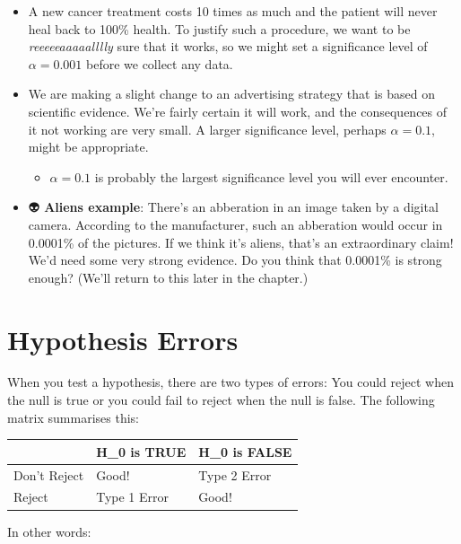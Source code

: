 \documentclass[
  letterpaper,
  DIV=11,
  numbers=noendperiod,
  oneside]{scrreprt}
\providecommand{\tightlist}{%
  \setlength{\itemsep}{0pt}\setlength{\parskip}{0pt}}\usepackage{longtable,booktabs,array}
\begin{document}
\begin{itemize}
\tightlist
\item
  A new cancer treatment costs 10 times as much and the patient will
  never heal back to 100\% health. To justify such a procedure, we want
  to be \emph{reeeeeaaaaalllly} sure that it works, so we might set a
  significance level of \(\alpha=0.001\) before we collect any data.
\item
  We are making a slight change to an advertising strategy that is based
  on scientific evidence. We're fairly certain it will work, and the
  consequences of it not working are very small. A larger significance
  level, perhaps \(\alpha = 0.1\), might be appropriate.

  \begin{itemize}
  \tightlist
  \item
    \(\alpha = 0.1\) is probably the largest significance level you will
    ever encounter.
  \end{itemize}
\item
  👽 \textbf{Aliens example}: There's an abberation in an image taken by
  a digital camera. According to the manufacturer, such an abberation
  would occur in 0.0001\% of the pictures. If we think it's aliens,
  that's an extraordinary claim! We'd need some very strong evidence. Do
  you think that 0.0001\% is strong enough? (We'll return to this later
  in the chapter.)
\end{itemize}

\hypertarget{hypothesis-errors}{%
\section{Hypothesis Errors}\label{hypothesis-errors}}

When you test a hypothesis, there are two types of errors: You could
reject when the null is true or you could fail to reject when the null
is false. The following matrix summarises this:

\begin{longtable}[]{@{}lll@{}}
\toprule\noalign{}
& H\_0 is TRUE & H\_0 is FALSE \\
\midrule\noalign{}
\endhead
\bottomrule\noalign{}
\endlastfoot
Don't Reject & Good! & Type 2 Error \\
Reject & Type 1 Error & Good! \\
\end{longtable}

In other words:\vspace{-3mm}
\end{document}
